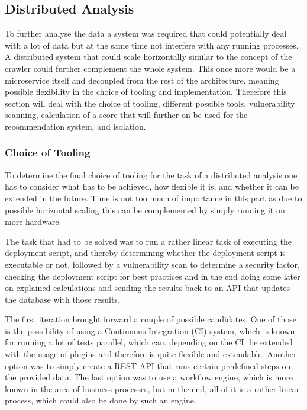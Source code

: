 \subsection{Distributed Analysis}
To further analyse the data a system was required that could potentially deal with a lot of data but at the same time not interfere with any running processes. A distributed system that could scale horizontally similar to the concept of the crawler could further complement the whole system. This once more would be a microservice itself and decoupled from the rest of the architecture, meaning possible flexibility in the choice of tooling and implementation. Therefore this section will deal with the choice of tooling, different possible tools, vulnerability scanning, calculation of a score that will further on be used for the recommendation system, and isolation.

\subsubsection{Choice of Tooling}
To determine the final choice of tooling for the task of a distributed analysis one has to consider what has to be achieved, how flexible it is, and whether it can be extended in the future. Time is not too much of importance in this part as due to possible horizontal scaling this can be complemented by simply running it on more hardware.

The task that had to be solved was to run a rather linear task of executing the deployment script, and thereby determining whether the deployment script is executable or not, followed by a vulnerability scan to determine a security factor, checking the deployment script for best practices and in the end doing some later on explained calculations and sending the results back to an API that updates the database with those results.

The first iteration brought forward a couple of possible candidates. One of those is the possibility of using a Continuous Integration (CI) system, which is known for running a lot of tests parallel, which can, depending on the CI, be extended with the usage of plugins and therefore is quite flexible and extendable. Another option was to simply create a REST API that runs certain predefined steps on the provided data. The last option was to use a workflow engine, which is more known in the area of business processes, but in the end, all of it is a rather linear process, which could also be done by such an engine.

